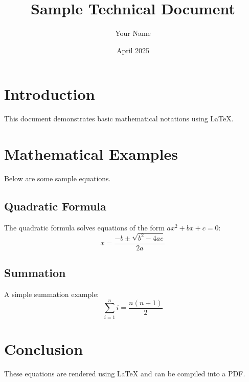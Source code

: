 \documentclass{article}
\title{Sample Technical Document}
\author{Your Name}
\date{April 2025}
\begin{document}
\maketitle

\section{Introduction}
This document demonstrates basic mathematical notations using LaTeX.

\section{Mathematical Examples}
Below are some sample equations.

\subsection{Quadratic Formula}
The quadratic formula solves equations of the form $ax^2 + bx + c = 0$:
\begin{equation}
x = \frac{-b \pm \sqrt{b^2 - 4ac}}{2a}
\end{equation}

\subsection{Summation}
A simple summation example:
\begin{equation}
\sum_{i=1}^{n} i = \frac{n(n+1)}{2}
\end{equation}

\section{Conclusion}
These equations are rendered using LaTeX and can be compiled into a PDF.
\end{document}
